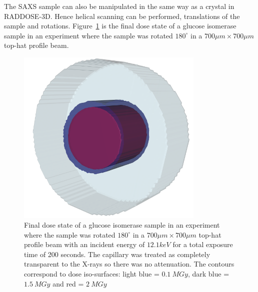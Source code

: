 The SAXS sample can also be manipulated in the same way as a crystal in RADDOSE-3D. Hence helical scanning can be performed, translations of the sample and rotations. Figure~\ref{fig:SAXS cylinder rotated} is the final dose state of a glucose isomerase sample in an experiment where the sample was rotated $180^{\circ}$ in a $ 700 \mu m \times 700 \mu m $ top-hat profile beam.
\begin{figure}
    \centering
    \includegraphics[width=0.8\textwidth]{figures/saxs/SAXScylinder.png}
    \caption{Final dose state of a glucose isomerase sample in an experiment where the sample was rotated $180^{\circ}$ in a $ 700 \mu m \times 700 \mu m $ top-hat profile beam with an incident energy of $ 12.1 keV $ for a total exposure time of 200 seconds. The capillary was treated as completely transparent to the X-rays so there was no attenuation. The contours correspond to dose iso-surfaces: light blue = $ 0.1\ MGy $, dark blue = $ 1.5\ MGy $ and red = $ 2\ MGy $ }
    \label{fig:SAXS cylinder rotated}
\end{figure}
